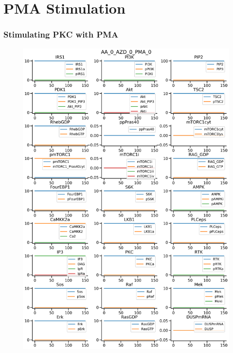 \documentclass{beamer}
\begin{document}
\section{PMA Stimulation}
\begin{frame}
\frametitle{Stimulating PKC with PMA}
\begin{figure}
    \begin{minipage}{0.45\textwidth}
        \centering
        \includegraphics[width=\textwidth]{../simulations/ExtendedPI3KModel/validations/AAWithAZDWithPMA/AA_0_AZD_0_PMA_0-0.png}
    \end{minipage}
    \begin{minipage}{0.45\textwidth}
        \centering

\end{minipage}
\end{figure}
\end{frame}
\end{document}
